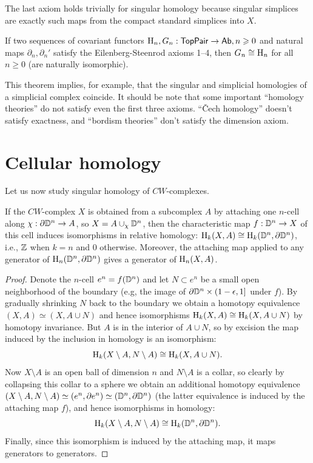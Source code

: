 The last axiom holds trivially for singular homology because singular simplices are exactly such maps from the compact standard simplices into $X$.


\begin{thm}
    If two sequences of covariant functors $\mathrm{H}_n,G_n:\mathsf{TopPair}\to \mathsf{Ab}, n\geqslant 0$ and natural maps $\partial_n,\partial_n '$ satisfy the Eilenberg-Steenrod axioms 1--4, then $G_n\cong \mathrm{H}_n$ for all $n\geq 0$ (are naturally isomorphic).
\end{thm}

 This theorem implies, for example, that the singular and simplicial homologies of a simplicial complex coincide. It should be note that some important ``homology theories'' do not satisfy even the first three axioms. ``\v Cech homology'' doesn't satisfy exactness, and ``bordism theories'' don't satisfy the dimension axiom.


\section{Cellular homology}

Let us now study singular homology of $CW$-complexes.


\begin{prop}\label{lem 39.1 munkres}
    If the $CW$-complex $X$ is obtained from a subcomplex $A$ by attaching one $n$-cell along $\chi:\partial \mathbb{D}^n\to A$, so $X=A\cup_\chi \mathbb{D}^n$, then the characteristic map $f:\mathbb{D}^n\to X$ of this cell induces isomorphisms in relative homology: $\mathrm{H}_k(X,A)\cong \mathrm{H}_k(\mathbb{D}^n,\partial \mathbb{D}^n)$, i.e., $\mathbb{Z}$ when $k=n$ and $0$ otherwise. Moreover, the attaching map applied to any generator of $\mathrm{H}_n(\mathbb{D}^n,\partial \mathbb{D}^n)$ gives a generator of $\mathrm{H}_n(X,A)$.
\end{prop}
\begin{proof}
    Denote the $n$-cell $e^n=f(\mathbb{D}^n)$ and let $N\subset e^n$ be a small open neighborhood of the boundary (e.g, the image of $\partial \mathbb{D}^n\times (1-\epsilon,1]$ under $f$). By gradually shrinking $N$ back to the boundary we obtain a homotopy equivalence $(X,A)\simeq (X,A\cup N)$ and hence isomorphisms $\mathrm{H}_k(X,A)\cong \mathrm{H}_k(X,A\cup N)$ by homotopy invariance. But $A$ is in the interior of $A\cup N$, so by excision the map induced by the inclusion in homology is an isomorphism:
    \[\mathrm{H}_k(X\setminus A,N\setminus A)\cong \mathrm{H}_k(X,A\cup N).\]
    Now $X\setminus A$ is an open ball of dimension $n$ and $N\setminus A$ is a collar, so clearly by collapsing this collar to a sphere we obtain an additional homotopy equivalence $(X\setminus A,N\setminus A)\simeq (e^n,\partial e^n)\simeq (\mathbb{D}^n,\partial \mathbb{D}^n)$ (the latter equivalence is induced by the attaching map $f$), and hence isomorphisms in homology:
    \[\mathrm{H}_k(X\setminus A,N\setminus A)\cong \mathrm{H}_k(\mathbb{D}^n,\partial \mathbb{D}^n).\]
    Finally, since this isomorphism is induced by the attaching map, it maps generators to generators.
\end{proof}

